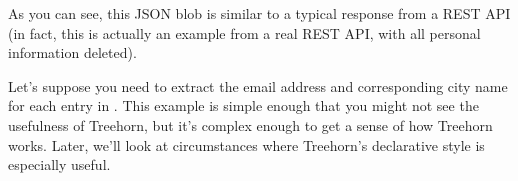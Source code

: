 \documentclass[letterpaper,10pt,english]{sphinxmanual}
\begin{document}
\begin{sphinxVerbatim}[commandchars=\\\{\}]
             
             
             
             
                 
                 
             
             
             
    \PYG{p}{]}
\end{sphinxVerbatim}

As you can see, this JSON blob is similar to a typical response from a REST API (in fact, this is actually an example from a real REST API, with all personal information deleted).

Let’s suppose you need to extract the email address and corresponding city name for each entry in . This example is simple enough that you might not see the usefulness of Treehorn, but it’s complex enough to get a sense of how Treehorn works. Later, we’ll look at circumstances where Treehorn’s declarative style is especially useful.
\end{document}
